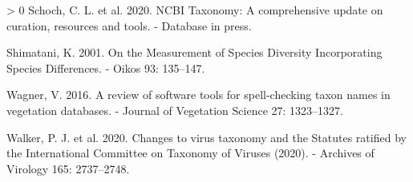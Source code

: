 \documentclass[10pt,oneside]{article}
\newlength{\cslhangindent}
\newenvironment{CSLReferences}[3] %
 {%
  \setlength{\parindent}{0pt}
  \ifodd #1 \everypar{\setlength{\hangindent}{\cslhangindent}}\ignorespaces\fi
  \ifnum #2 > 0
  \setlength{\parskip}{#2\baselineskip}
  \fi
 }%
 {}
\begin{document}
\begin{CSLReferences}{1}{0}
\leavevmode\hypertarget{ref-Schoch2020NcbTax}{}%
Schoch, C. L. et al. 2020. NCBI Taxonomy: A comprehensive update on
curation, resources and tools. - Database in press.

\leavevmode\hypertarget{ref-Shimatani2001MeaSpe}{}%
Shimatani, K. 2001. On the Measurement of Species Diversity
Incorporating Species Differences. - Oikos 93: 135--147.

\leavevmode\hypertarget{ref-Wagner2016RevSof}{}%
Wagner, V. 2016. A review of software tools for spell-checking taxon
names in vegetation databases. - Journal of Vegetation Science 27:
1323--1327.

\leavevmode\hypertarget{ref-Walker2020ChaVir}{}%
Walker, P. J. et al. 2020. Changes to virus taxonomy and the Statutes
ratified by the International Committee on Taxonomy of Viruses (2020). -
Archives of Virology 165: 2737--2748.

\end{CSLReferences}
\end{document}
